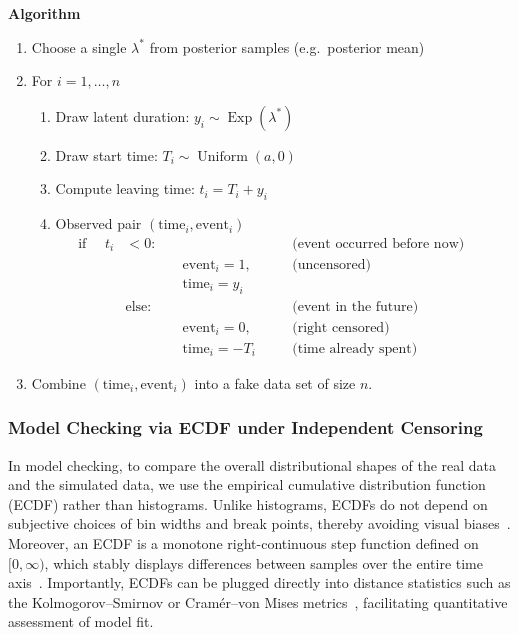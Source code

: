 \begin{tcolorbox}
\textbf{Algorithm}
\begin{enumerate}[itemsep=2pt,parsep=0pt,topsep=2pt]
  \item Choose a single $\lambda^\ast$ from posterior samples \hfill (e.g.\ posterior mean)
  \item For $i = 1,\dots,n$
          \begin{enumerate}
            \item Draw latent duration: $y_i \sim \operatorname{Exp}(\lambda^\ast)$
            \item Draw start time: $T_i \sim \operatorname{Uniform}(a,0)$
            \item Compute leaving time: $t_i = T_i + y_i$
            \item Observed pair $(\text{time}_i,\text{event}_i)$ \[\begin{aligned}
\text{if } \quad t_i &< 0: &&&\text{(event occurred before now)}\\
  &&\quad  \text{event}_i=1, &&\text{(uncensored)}\\ 
  &&\quad \text{time}_i=y_i
   &\quad \\
&\text{else}: &&&\text{(event in the future)}\\
   &&\quad \text{event}_i=0, &&\text{(right censored)}\\ 
   &&\quad \text{time}_i=-T_i &&\text{(time already spent)}
   &\quad 
\end{aligned}\]
          \end{enumerate}
  \item Combine $(\text{time}_i,\text{event}_i)$ into a fake data set of size $n$.
\end{enumerate}
\end{tcolorbox}





\subsubsection{Model Checking via ECDF under Independent Censoring}
In model checking, to compare the overall distributional shapes of the real data and the simulated data, we use the empirical cumulative distribution function (ECDF) rather than histograms. Unlike histograms, ECDFs do not depend on subjective choices of bin widths and break points, thereby avoiding visual biases~\cite{berg2008data}. Moreover, an ECDF is a monotone right-continuous step function defined on $[0,\infty)$, which stably displays differences between samples over the entire time axis~\cite{arnold2011nonparametric, berg2008data}. Importantly, ECDFs can be plugged directly into distance statistics such as the Kolmogorov–Smirnov or Cramér–von Mises metrics~\cite{arnold2011nonparametric}, facilitating quantitative assessment of model fit.


